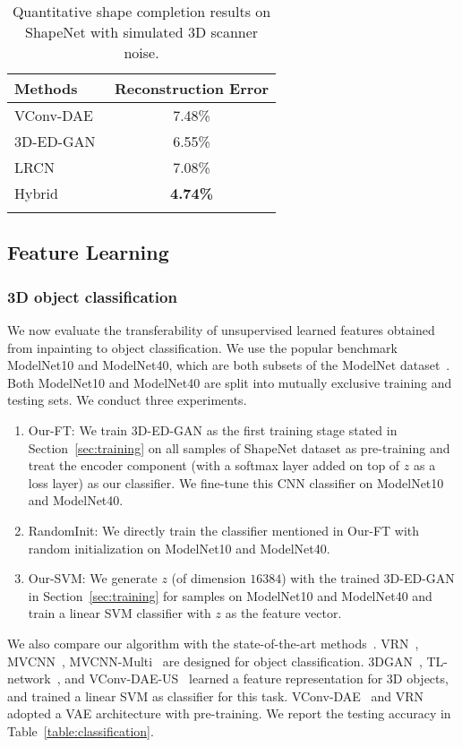 \documentclass[10pt,twocolumn,letterpaper]{article}
\begin{document}
\begin{table}
\begin{center}
\setlength{\tabcolsep}{0.1em}
\begin{tabular}{lc}
\Xhline{3\arrayrulewidth}
Methods&Reconstruction Error\\
\hline
VConv-DAE~\cite{vconvdae} & 7.48\% \\
3D-ED-GAN & 6.55\% \\
LRCN & 7.08\%\\
Hybrid&\textbf{4.74\%}\\
\Xhline{3\arrayrulewidth}
\end{tabular}
\end{center}
\caption{Quantitative shape completion results on ShapeNet with simulated 3D scanner noise.}
\label{table:completionhigh}
\end{table}

\subsection{Feature Learning}
\label{sec:featurelearning}
\subsubsection{3D object classification}
We now evaluate the transferability of unsupervised learned features obtained from inpainting to object classification. We use the popular benchmark ModelNet10 and ModelNet40, which are both subsets of the ModelNet dataset~\cite{modelnet}. Both ModelNet10 and ModelNet40 are split into mutually exclusive training and testing sets. We conduct three experiments.
\begin{enumerate}
\item Our-FT: We train 3D-ED-GAN as the first training stage stated in Section~\ref{sec:training} on all samples of ShapeNet dataset as pre-training and treat the encoder component (with a softmax layer added on top of $z$ as a loss layer) as our classifier. We fine-tune this CNN classifier on ModelNet10 and ModelNet40. 
\item RandomInit: We directly train the classifier mentioned in Our-FT with random initialization on ModelNet10 and ModelNet40.
\item Our-SVM: We generate $z$ (of dimension $16384$) with the trained 3D-ED-GAN in Section~\ref{sec:training} for samples on ModelNet10 and ModelNet40 and train a linear SVM classifier with $z$ as the feature vector.
\end{enumerate}
We also compare our algorithm with the state-of-the-art methods~\cite{3dgan,vconvdae,tl,generativediscriminative,sumultiview,qimultiview,shapenet}. VRN~\cite{generativediscriminative}, MVCNN~\cite{sumultiview}, MVCNN-Multi~\cite{qimultiview} are designed for object classification. 3DGAN~\cite{3dgan}, TL-network~\cite{tl}, and VConv-DAE-US~\cite{vconvdae} learned a feature representation for 3D objects, and trained a linear SVM as classifier for this task. VConv-DAE~\cite{vconvdae} and VRN~\cite{generativediscriminative} adopted a VAE architecture with pre-training. We report the testing accuracy in Table~\ref{table:classification}.
\end{document}
